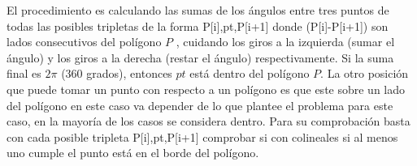 El procedimiento es calculando las sumas de los ángulos entre tres puntos de todas las posibles tripletas de la forma {P[i],pt,P[i+1]} donde (P[i]-P[i+1]) son lados consecutivos del polígono $P$ , cuidando los giros a la izquierda (sumar el ángulo) y los giros a la derecha (restar el ángulo) respectivamente. Si la suma final es $2\pi$ (360 grados), entonces $pt$ está dentro del polígono $P$. La otro posición que puede tomar un punto con respecto a un polígono es que este sobre un lado del polígono en este caso va depender de lo que plantee el problema para este caso, en la mayoría de los casos se considera dentro. Para su comprobación basta con cada posible  tripleta {P[i],pt,P[i+1]} comprobar si con colineales si al menos uno cumple el punto está en el borde del polígono.
